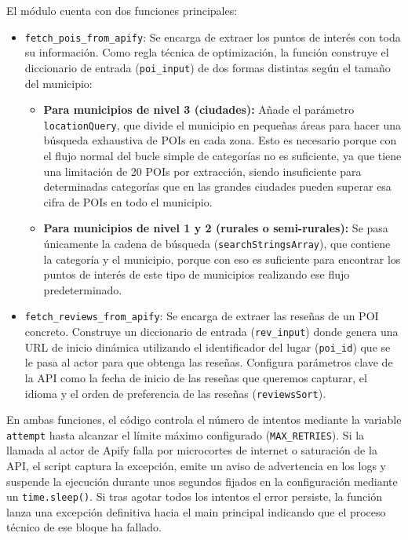 El módulo cuenta con dos funciones principales:
\begin{itemize}
    \item \texttt{fetch\_pois\_from\_apify}: Se encarga de extraer los puntos de interés con toda su información. Como regla técnica de optimización, la función construye el diccionario de entrada (\texttt{poi\_input}) de dos formas distintas según el tamaño del municipio:
    \begin{itemize}
        \item \textbf{Para municipios de nivel 3 (ciudades):} Añade el parámetro \texttt{locationQuery}, que divide el municipio en pequeñas áreas para hacer una búsqueda exhaustiva de POIs en cada zona. Esto es necesario porque con el flujo normal del bucle simple de categorías no es suficiente, ya que tiene una limitación de 20 POIs por extracción, siendo insuficiente para determinadas categorías que en las grandes ciudades pueden superar esa cifra de POIs en todo el municipio.
        \item \textbf{Para municipios de nivel 1 y 2 (rurales o semi-rurales):} Se pasa únicamente la cadena de búsqueda (\texttt{searchStringsArray}), que contiene la categoría y el municipio, porque con eso es suficiente para encontrar los puntos de interés de este tipo de municipios realizando ese flujo predeterminado.
    \end{itemize}
    
    \item \texttt{fetch\_reviews\_from\_apify}: Se encarga de extraer las reseñas de un POI concreto. Construye un diccionario de entrada (\texttt{rev\_input}) donde genera una URL de inicio dinámica utilizando el identificador del lugar (\texttt{poi\_id}) que se le pasa al actor para que obtenga las reseñas. Configura parámetros clave de la API como la fecha de inicio de las reseñas que queremos capturar, el idioma y el orden de preferencia de las reseñas (\texttt{reviewsSort}).
\end{itemize}


En ambas funciones, el código controla el número de intentos mediante la variable \texttt{attempt} hasta alcanzar el límite máximo configurado (\texttt{MAX\_RETRIES}). Si la llamada al actor de Apify falla por microcortes de internet o saturación de la API, el script captura la excepción, emite un aviso de advertencia en los logs y suspende la ejecución durante unos segundos fijados en la configuración mediante un \texttt{time.sleep()}. Si tras agotar todos los intentos el error persiste, la función lanza una excepción definitiva hacia el main principal indicando que el proceso técnico de ese bloque ha fallado.

